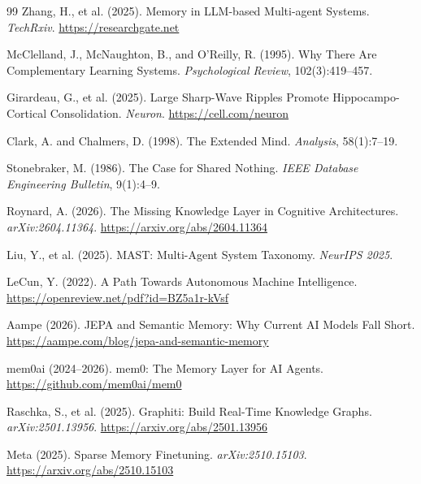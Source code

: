 \documentclass[11pt,letterpaper]{article}
\begin{document}
\begin{thebibliography}{99}
Zhang, H., et al. (2025).
\newblock Memory in LLM-based Multi-agent Systems.
\newblock \textit{TechRxiv}. \url{https://researchgate.net}

McClelland, J., McNaughton, B., and O'Reilly, R. (1995).
\newblock Why There Are Complementary Learning Systems.
\newblock \textit{Psychological Review}, 102(3):419--457.

Girardeau, G., et al. (2025).
\newblock Large Sharp-Wave Ripples Promote Hippocampo-Cortical Consolidation.
\newblock \textit{Neuron}. \url{https://cell.com/neuron}

Clark, A. and Chalmers, D. (1998).
\newblock The Extended Mind.
\newblock \textit{Analysis}, 58(1):7--19.

Stonebraker, M. (1986).
\newblock The Case for Shared Nothing.
\newblock \textit{IEEE Database Engineering Bulletin}, 9(1):4--9.

Roynard, A. (2026).
\newblock The Missing Knowledge Layer in Cognitive Architectures.
\newblock \textit{arXiv:2604.11364}. \url{https://arxiv.org/abs/2604.11364}

Liu, Y., et al. (2025).
\newblock MAST: Multi-Agent System Taxonomy.
\newblock \textit{NeurIPS 2025}.

LeCun, Y. (2022).
\newblock A Path Towards Autonomous Machine Intelligence.
\newblock \url{https://openreview.net/pdf?id=BZ5a1r-kVsf}

Aampe (2026).
\newblock JEPA and Semantic Memory: Why Current AI Models Fall Short.
\newblock \url{https://aampe.com/blog/jepa-and-semantic-memory}

mem0ai (2024--2026).
\newblock mem0: The Memory Layer for AI Agents.
\newblock \url{https://github.com/mem0ai/mem0}

Raschka, S., et al. (2025).
\newblock Graphiti: Build Real-Time Knowledge Graphs.
\newblock \textit{arXiv:2501.13956}. \url{https://arxiv.org/abs/2501.13956}

Meta (2025).
\newblock Sparse Memory Finetuning.
\newblock \textit{arXiv:2510.15103}. \url{https://arxiv.org/abs/2510.15103}

\end{thebibliography}

\appendix
\end{document}
